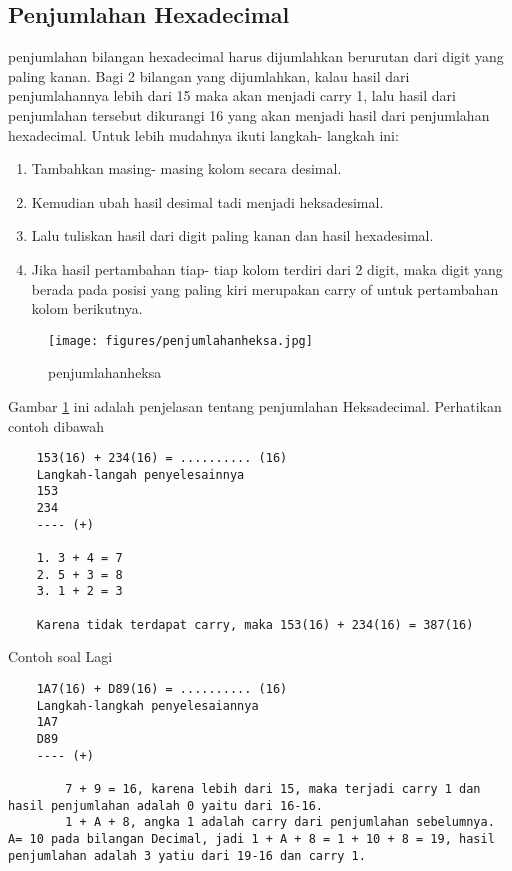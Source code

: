 	\subsection {Penjumlahan Hexadecimal}
	penjumlahan bilangan hexadecimal harus dijumlahkan berurutan dari digit yang paling kanan. Bagi 2 bilangan yang dijumlahkan, kalau hasil dari penjumlahannya lebih dari 15 maka akan menjadi carry 1, lalu hasil dari penjumlahan tersebut dikurangi 16 yang akan menjadi hasil dari penjumlahan hexadecimal.
	Untuk lebih mudahnya ikuti langkah- langkah ini:
		\begin{enumerate}
			\item Tambahkan masing- masing kolom secara desimal.
			\item Kemudian ubah hasil desimal tadi menjadi heksadesimal.
			\item Lalu tuliskan hasil dari digit paling kanan dan hasil hexadesimal.
			\item Jika hasil pertambahan tiap- tiap kolom terdiri dari 2 digit, maka digit yang berada pada posisi yang paling kiri merupakan carry of untuk pertambahan kolom berikutnya.
		\end{enumerate}
			\begin{figure} [ht]
				\centerline{\texttt{[image: figures/penjumlahanheksa.jpg]}}
				\caption{penjumlahanheksa}
				\label{penjumlahanheksa}
			\end{figure}
	Gambar \ref{penjumlahanheksa} ini adalah penjelasan tentang penjumlahan Heksadecimal.		
	Perhatikan contoh dibawah
\begin{verbatim}
	153(16) + 234(16) = .......... (16) 
	Langkah-langah penyelesainnya
	153 
	234 
	---- (+)

	1. 3 + 4 = 7
	2. 5 + 3 = 8
	3. 1 + 2 = 3

	Karena tidak terdapat carry, maka 153(16) + 234(16) = 387(16)
\end{verbatim}
	Contoh soal Lagi 
\begin{verbatim}
	1A7(16) + D89(16) = .......... (16)
	Langkah-langkah penyelesaiannya
	1A7
	D89
	---- (+)

		7 + 9 = 16, karena lebih dari 15, maka terjadi carry 1 dan hasil penjumlahan adalah 0 yaitu dari 16-16.
		1 + A + 8, angka 1 adalah carry dari penjumlahan sebelumnya. A= 10 pada bilangan Decimal, jadi 1 + A + 8 = 1 + 10 + 8 = 19, hasil penjumlahan adalah 3 yatiu dari 19-16 dan carry 1.
\end{verbatim}	

